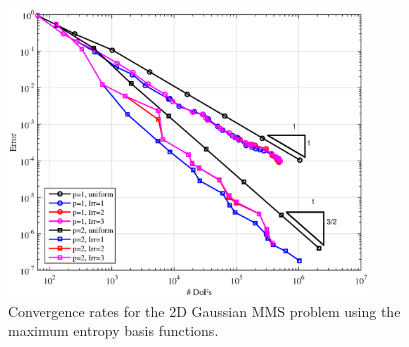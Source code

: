 \begin{figure}
\centering
\includegraphics[width=0.85\textwidth]{figures/sec_BF/TransportMMS_Gauss2D_MAXENT_Err.eps}
\caption{Convergence rates for the 2D Gaussian MMS problem using the maximum entropy basis functions.}
\label{fig::BF_Results_MMS_Gauss2D_poly}
\end{figure}


